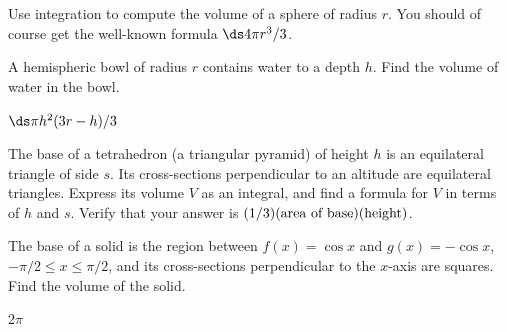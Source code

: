 \begin{enumialphparenastyle}
\begin{ex}
 Use integration to compute the volume of a sphere of radius
$r$. You should of course get the well-known formula $\ds 4\pi r^3/3$.
\end{ex}

\begin{ex}
A hemispheric bowl of radius $r$ contains water to a depth $h$.  Find
the volume of water in the bowl.
\begin{sol}
 $\ds \pi h^2(3r-h)/3$
\end{sol}
\end{ex}

\begin{ex}
 The base of a tetrahedron (a triangular pyramid) of height $h$
is an equilateral triangle of side $s$.  Its cross-sections
perpendicular to an altitude are equilateral triangles.  Express its
volume $V$ as an integral, and find a formula for $V$ in terms of $h$
and $s$. Verify that your answer is $(1/3)(\hbox{area of base})(\hbox{height})$. 
\end{ex}

\begin{ex}
The base of a solid is the region between $f(x)=\cos x$ and
$g(x)=-\cos x$, $-\pi/2\le x\le\pi/2$,
and its cross-sections perpendicular to the $x$-axis 
are squares.
Find the volume of the solid.
\begin{sol}
 $2\pi$
\end{sol}
\end{ex}

\end{enumialphparenastyle}